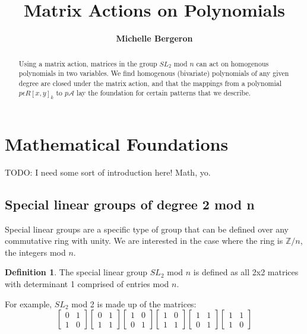 \documentclass[a4paper,draft]{amsproc}
\title[Matrix Actions]{Matrix Actions on Polynomials}
\author[Bergeron]{\bfseries Michelle Bergeron}
\theoremstyle{plain}
\theoremstyle{definition}
\newtheorem{dfn}{Definition}[section]
\theoremstyle{remark}
\numberwithin{equation}{section}
\begin{document}
\vspace{18mm} \setcounter{page}{1} \thispagestyle{empty}


\begin{abstract}
Using a matrix action, matrices in the group $SL_{2}$ mod $n$ can act on homogenous polynomials in two variables. We find homogenous (bivariate) polynomials of any given degree are closed under the matrix action, and that the mappings from a polynomial $p \epsilon R[x,y]_{k}$ to  $p\mathcal{A}$ lay the foundation for certain patterns that we describe. 
\end{abstract}

\maketitle

\section{Mathematical Foundations} 

TODO: I need some sort of introduction here! Math, yo. 

\subsection{Special linear groups of degree 2 mod n}
Special linear groups are a specific type of group that can be defined over any commutative ring with unity. We are interested in the case where the ring is $\mathbb{Z}/n$, the integers mod $n$. 
\begin{dfn}
The special linear group $SL_{2}$ mod $n$ is defined as all 2x2 matrices with determinant 1 comprised of entries mod $n$.
\end{dfn}

For example, $SL_{2}$ mod 2 is made up of the matrices:
$$
\begin{bmatrix}
 0&1 \\ 
 1&0 
\end{bmatrix}
\begin{bmatrix}
 0&1 \\ 
 1&1 
\end{bmatrix}
\begin{bmatrix}
 1&0 \\ 
 0&1 
\end{bmatrix}
\begin{bmatrix}
 1&0 \\ 
 1&1 
\end{bmatrix}
\begin{bmatrix}
 1&1 \\ 
 0&1 
\end{bmatrix}
\begin{bmatrix}
 1&1 \\ 
 1&0 
\end{bmatrix}
$$
\end{document}
